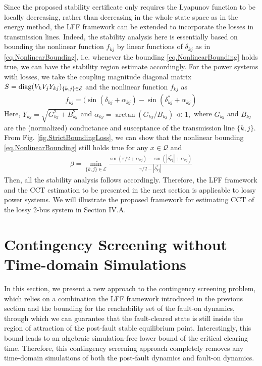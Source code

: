 \documentclass[final]{IEEEtran}
\begin{document}
\begin{remark} Since the proposed stability
certificate only requires the Lyapunov function to be locally
decreasing, rather than decreasing in the whole state space as in
the energy method, the LFF framework can be extended to
incorporate the losses in transmission lines. Indeed, the
stability analysis here is essentially based on bounding the
nonlinear function $f_{kj}$ by linear functions of $\delta_{kj}$
as in \eqref{eq.NonlinearBounding}, i.e. whenever the bounding
\eqref{eq.NonlinearBounding}  holds true, we can have the
stability region estimate accordingly. For the power systems with
losses, we take the coupling magnitude diagonal matrix
$S=\emph{\emph{diag}}(V_kV_jY_{kj})_{\{k,j\}\in \mathcal{E}}$ and
the nonlinear function $f_{kj}$ as
\begin{align}
f_{kj}=
(\sin(\delta_{kj}+\alpha_{kj})-\sin(\delta^*_{kj}+\alpha_{kj})
\end{align}
Here, $Y_{kj}=\sqrt{G_{kj}^2+B_{kj}^2}$ and
$\alpha_{kj}=\arctan(G_{kj}/B_{kj}) \ll 1,$ where $G_{kj}$ and
$B_{kj}$ are the (normalized) conductance and susceptance of the
transmission line $\{k,j\}.$ From Fig.
\ref{fig.StrictBoundingLoss}, we can show that the nonlinear
bounding \eqref{eq.NonlinearBounding} still holds true for any
$x\in \mathcal{Q}$ and
\begin{align}
\beta=\min_{\{k,j\}\in\mathcal{E}}
\frac{\sin(\pi/2+\alpha_{kj})-\sin(|\delta^*_{kj}|+\alpha_{kj})}{\pi/2-|\delta_{kj}^*|}
\end{align} Then, all the stability analysis follows accordingly. Therefore, the LFF framework and the CCT estimation to be presented in the next section is applicable to lossy power systems. We will illustrate the proposed framework for estimating CCT of the lossy 2-bus system in Section IV.A.
\end{remark}


\section{Contingency Screening without Time-domain Simulations}
\label{sec:certificate}

In this section, we present a new approach to the contingency
screening  problem, which relies on a combination the LFF
framework introduced in the previous section and the bounding for
the reachability set of the fault-on dynamics, through which we
can guarantee that the fault-cleared state is still inside the
region of attraction of the post-fault stable equilibrium point.
Interestingly, this bound leads to an algebraic simulation-free
lower bound of the critical clearing time. Therefore, this
contingency screening approach completely removes any time-domain
simulations of both the post-fault dynamics and fault-on dynamics.
\end{document}
